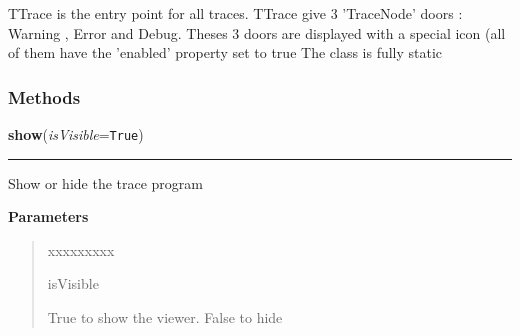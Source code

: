 TTrace is the entry point for all traces. TTrace give 3 'TraceNode' doors :
Warning , Error and Debug. Theses 3 doors are displayed with a special icon
(all of them have the 'enabled' property set to true The class is fully 
static



  \subsubsection{Methods}

    \label{tracetool:TTrace:show}

    \vspace{0.5ex}

\hspace{.8\funcindent}\begin{boxedminipage}{\funcwidth}

    \raggedright \textbf{show}(\textit{isVisible}={\tt True})

    \vspace{-1.5ex}

    \rule{\textwidth}{0.5\fboxrule}
\setlength{\parskip}{2ex}
    Show or hide the trace program

\setlength{\parskip}{1ex}
      \textbf{Parameters}
      \vspace{-1ex}

      \begin{quote}
        \begin{Ventry}{xxxxxxxxx}

          \item[isVisible]

          True to show the viewer. False to hide

        \end{Ventry}

      \end{quote}

    \end{boxedminipage}

    \label{tracetool:TTrace:find}

